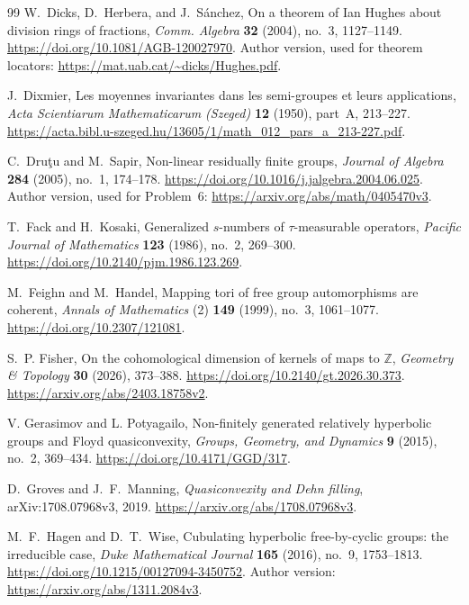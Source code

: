 \begin{thebibliography}{99}
W.~Dicks, D.~Herbera, and J.~S\'anchez,
On a theorem of Ian Hughes about division rings of fractions,
\emph{Comm. Algebra} \textbf{32} (2004), no.~3, 1127--1149.
\url{https://doi.org/10.1081/AGB-120027970}.
Author version, used for theorem locators:
\url{https://mat.uab.cat/~dicks/Hughes.pdf}.

J.~Dixmier,
Les moyennes invariantes dans les semi-groupes et leurs applications,
\emph{Acta Scientiarum Mathematicarum (Szeged)} \textbf{12} (1950),
part~A, 213--227.
\url{https://acta.bibl.u-szeged.hu/13605/1/math_012_pars_a_213-227.pdf}.

C.~Dru\c{t}u and M.~Sapir,
Non-linear residually finite groups,
\emph{Journal of Algebra} \textbf{284} (2005), no.~1, 174--178.
\url{https://doi.org/10.1016/j.jalgebra.2004.06.025}.
Author version, used for Problem~6:
\url{https://arxiv.org/abs/math/0405470v3}.

T.~Fack and H.~Kosaki,
Generalized $s$-numbers of $\tau$-measurable operators,
\emph{Pacific Journal of Mathematics} \textbf{123} (1986), no.~2, 269--300.
\url{https://doi.org/10.2140/pjm.1986.123.269}.

M.~Feighn and M.~Handel,
Mapping tori of free group automorphisms are coherent,
\emph{Annals of Mathematics} (2) \textbf{149} (1999), no.~3, 1061--1077.
\url{https://doi.org/10.2307/121081}.

S.~P. Fisher,
On the cohomological dimension of kernels of maps to $\mathbb Z$,
\emph{Geometry \& Topology} \textbf{30} (2026), 373--388.
\url{https://doi.org/10.2140/gt.2026.30.373}.
\url{https://arxiv.org/abs/2403.18758v2}.

V. Gerasimov and L. Potyagailo,
Non-finitely generated relatively hyperbolic groups and Floyd quasiconvexity,
\emph{Groups, Geometry, and Dynamics} \textbf{9} (2015), no.~2, 369--434.
\url{https://doi.org/10.4171/GGD/317}.

D.~Groves and J.~F.~Manning,
\emph{Quasiconvexity and Dehn filling},
arXiv:1708.07968v3, 2019.
\url{https://arxiv.org/abs/1708.07968v3}.

M.~F.~Hagen and D.~T.~Wise,
Cubulating hyperbolic free-by-cyclic groups: the irreducible case,
\emph{Duke Mathematical Journal} \textbf{165} (2016), no.~9, 1753--1813.
\url{https://doi.org/10.1215/00127094-3450752}.
Author version: \url{https://arxiv.org/abs/1311.2084v3}.


\end{thebibliography}
